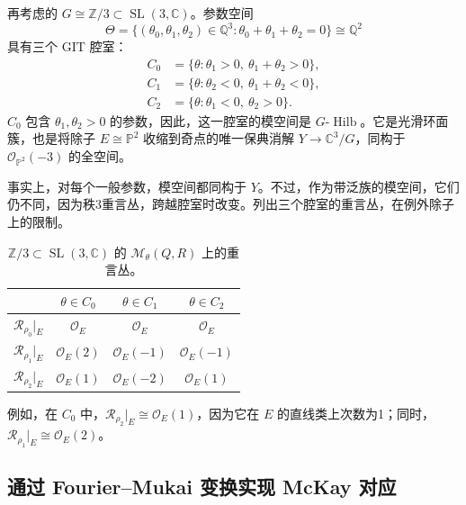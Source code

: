 \begin{example}\label{ex:4.91}
再考虑的 $G\cong\mathbb{Z}/3\subset\operatorname{SL}(3,\mathbb{C})$。参数空间
\[
\Theta=\{(\theta_0,\theta_1,\theta_2)\in\mathbb{Q}^3:
\theta_0+\theta_1+\theta_2=0\}\cong\mathbb{Q}^2
\]
具有三个 GIT 腔室：
\[
\begin{aligned}
C_0&=\{\theta:\theta_1>0,\ \theta_1+\theta_2>0\},\\
C_1&=\{\theta:\theta_2<0,\ \theta_1+\theta_2<0\},\\
C_2&=\{\theta:\theta_1<0,\ \theta_2>0\}.
\end{aligned}
\]
$C_0$ 包含 $\theta_1,\theta_2>0$ 的参数，因此，这一腔室的模空间是 $G\text{-}\operatorname{Hilb}$。它是光滑环面簇，也是将除子 $E\cong\mathbb{P}^2$ 收缩到奇点的唯一保典消解 $Y\to\mathbb{C}^3/G$，同构于 $\mathcal{O}_{\mathbb{P}^2}(-3)$ 的全空间。

事实上，对每个一般参数，模空间都同构于 $Y$。不过，作为带泛族的模空间，它们仍不同，因为秩3重言丛，跨越腔室时改变。列出三个腔室的重言丛，在例外除子上的限制。
\begin{table}[H]
\centering
\caption{$\mathbb{Z}/3\subset\operatorname{SL}(3,\mathbb{C})$ 的 $\mathcal{M}_\theta(Q,R)$ 上的重言丛。}\label{tab:4.2}
\begin{tabular}{lccc}
\toprule
 & $\theta\in C_0$ & $\theta\in C_1$ & $\theta\in C_2$\\
\midrule
$\mathcal{R}_{\rho_0}|_E$ & $\mathcal{O}_E$ & $\mathcal{O}_E$ & $\mathcal{O}_E$\\
$\mathcal{R}_{\rho_1}|_E$ & $\mathcal{O}_E(2)$ & $\mathcal{O}_E(-1)$ & $\mathcal{O}_E(-1)$\\
$\mathcal{R}_{\rho_2}|_E$ & $\mathcal{O}_E(1)$ & $\mathcal{O}_E(-2)$ & $\mathcal{O}_E(1)$\\
\bottomrule
\end{tabular}
\end{table}
例如，在 $C_0$ 中，$\mathcal{R}_{\rho_2}|_E\cong\mathcal{O}_E(1)$，因为它在 $E$ 的直线类上次数为1；同时，$\mathcal{R}_{\rho_1}|_E\cong\mathcal{O}_E(2)$。
\end{example}

\subsection{通过 Fourier--Mukai 变换实现 McKay 对应}\label{sec:4.7.4}

